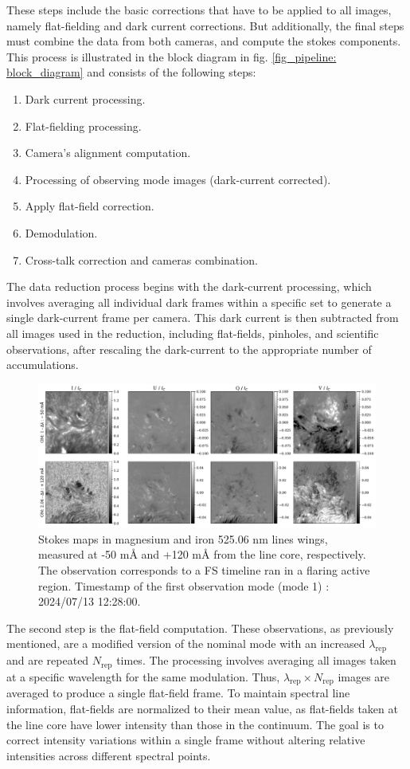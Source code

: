 These steps include the basic corrections that have to be applied to all images, namely flat-fielding and dark current corrections. But additionally, the final steps must combine the data from both cameras, and compute the stokes components. This process is illustrated in the block diagram in fig. \ref{fig_pipeline: block_diagram} and consists of the following steps:
\begin{enumerate}
  \item Dark current processing. 
  \item Flat-fielding processing.
  \item Camera's alignment computation. 
  \item Processing of observing mode images (dark-current corrected). 
  \item Apply flat-field correction.
  \item Demodulation. 
  \item Cross-talk correction and cameras combination.
  \end{enumerate}
The data reduction process begins with the dark-current processing, which involves averaging all individual dark frames within a specific set to generate a single dark-current frame per camera. This dark current is then subtracted from all images used in the reduction, including flat-fields, pinholes, and scientific observations, after rescaling the dark-current to the appropriate number of accumulations.

\begin{figure}[h]
  \includegraphics[width=\textwidth]{figures/Pipeline/Example_demodulation.pdf}
  \caption{Stokes maps in magnesium and iron 525.06 nm lines wings, measured at -50 m\r{A} and +120 m\r{A} from the line core, respectively. The observation corresponds to a FS timeline ran in a flaring active region. Timestamp of the first observation mode (mode 1) : 2024/07/13 12:28:00.  }
    \label{fig_pipeline: demodulated_data}
\end{figure}
The second step is the flat-field computation. These observations, as previously mentioned, are a modified version of the nominal mode with an increased $\lambda_{\text{rep}}$ and are repeated $N_{\text{rep}}$ times. The processing involves averaging all images taken at a specific wavelength for the same modulation. Thus, $\lambda_{\text{rep}} \times N_{\text{rep}}$ images are averaged to produce a single flat-field frame. To maintain spectral line information, flat-fields are normalized to their mean value, as flat-fields taken at the line core have lower intensity than those in the continuum. The goal is to correct intensity variations within a single frame without altering relative intensities across different spectral points.

